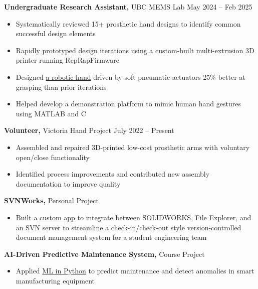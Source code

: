 \documentclass[11pt]{article}       %
\begin{document}
\textbf{Undergraduate Research Assistant,} {UBC MEMS Lab} \hfill May 2024 -- Feb 2025 \\
\vspace{-8.5pt}
\begin{itemize}
  \item Systematically reviewed 15+ prosthetic hand designs to identify common successful design elements
  \item Rapidly prototyped design iterations using a custom-built multi-extrusion 3D printer running RepRapFirmware
  \item Designed \href{https://www.danielrbenjamin.com/projects/mems-hand/}{a robotic hand} driven by soft pneumatic actuators 25\% better at grasping than prior iterations
  \item Helped develop a demonstration platform to mimic human hand gestures using MATLAB and C
\end{itemize}


\textbf{Volunteer,} {Victoria Hand Project} \hfill July 2022 -- Present \\
\vspace{-8.5pt}
\begin{itemize}
  \item Assembled and repaired 3D-printed low-cost prosthetic arms with voluntary open/close functionality
  \item Identified process improvements and contributed new assembly documentation to improve quality
\end{itemize}

\textbf{SVNWorks,} {Personal Project} \\
\vspace{-8.5pt}
\begin{itemize}
  \item Built a \href{https://www.danielrbenjamin.com/projects/cad-infra/}{custom app} to integrate between SOLIDWORKS, File Explorer, and an SVN server to streamline a check-in/check-out style version-controlled document management system for a student engineering team
\end{itemize}

\textbf{AI-Driven Predictive Maintenance System,} {Course Project} \\
\vspace{-8.5pt}
\begin{itemize}
  \item Applied \href{https://www.danielrbenjamin.com/projects/manu465-project/}{ML in Python} to predict maintenance and detect anomalies in smart manufacturing equipment
\end{itemize}
\end{document}

